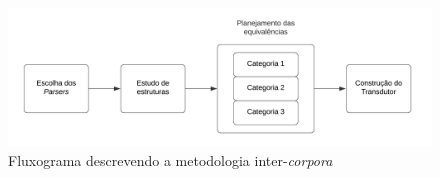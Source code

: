 \begin{figure}[!ht]
    \centering
    \includegraphics[width=\textwidth,scale=1.5]{imagens/fluxograma_metodolodia.png}

    \caption[Fluxograma descrevendo a metodologia inter-\textit{corpora}]{Fluxograma descrevendo a metodologia inter-\textit{corpora}}
    \label{fig:fluxograma_metodologia}
\end{figure}